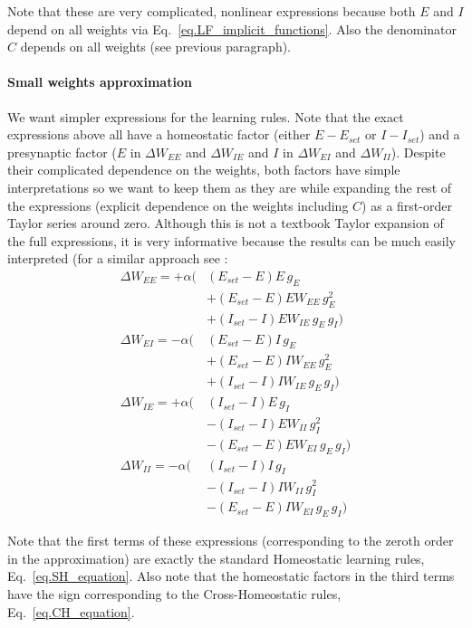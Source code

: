 \documentclass[
twocolumn,
]{article}
\newcommand{\EE}{\mathit{EE}}
\newcommand{\EI}{\mathit{EI}}
\newcommand{\IE}{\mathit{IE}}
\newcommand{\II}{\mathit{II}}
\newcommand{\set}{\mathit{set}}
\begin{document}
\noindent Note that these are very complicated, nonlinear expressions because both $E$ and $I$ depend on all weights via Eq.\ \ref{eq.LF_implicit_functions}. Also the denominator $C$ depends on all weights (see previous paragraph).


\paragraph{Small weights approximation}

We want simpler expressions for the learning rules. Note that the exact expressions above all have a homeostatic factor (either $E - E_{\set}$ or $I - I_{\set}$) and a presynaptic factor ($E$ in $\Delta W_{\EE}$ and $\Delta W_{\IE}$ and $I$ in $\Delta W_{\EI}$ and $\Delta W_{\II}$). Despite their complicated dependence on the weights, both factors have simple interpretations so we want to keep them as they are while expanding the rest of the expressions (explicit dependence on the weights including $C$) as a first-order Taylor series around zero. Although this is not a textbook Taylor expansion of the full expressions, it is very informative because the results can be much easily interpreted (for a similar approach see \cite{Mackwood2020}:
\begin{equation}
\begin{aligned}
\Delta W_{\EE} = + \alpha( & (E_{\set} - E)E \, g_E \\
& + (E_{\set} - E)E W_{\EE} \, g_E^2 \\
& + (I_{\set} - I)E W_{\IE} \, g_E \, g_I) \\
\Delta W_{\EI} = - \alpha( & (E_{\set} - E)I \, g_E \\
& + (E_{\set} - E)I W_{\EE} \, g_E^2 \\
& + (I_{\set} - I)I W_{\IE} \, g_E \, g_I) \\
\Delta W_{\IE} = + \alpha( & (I_{\set} - I)E \, g_I \\
& - (I_{\set} - I)E W_{\II} \, g_I^2 \\
& - (E_{\set} - E)E W_{\EI} \, g_E \, g_I) \\
\Delta W_{\II} = - \alpha( & (I_{\set} - I)I \, g_I \\
& - (I_{\set} - I)I W_{\II} \, g_I^2 \\
& - (E_{\set} - E)I W_{\EI} \, g_E \, g_I)
\end{aligned}
\label{eq.LF_smallweights}
\end{equation}

\noindent Note that the first terms of these expressions (corresponding to the zeroth order in the approximation) are exactly the standard Homeostatic learning rules, Eq.\ \ref{eq.SH_equation}. Also note that the homeostatic factors in the third terms have the sign corresponding to the Cross-Homeostatic rules, Eq.\ \ref{eq.CH_equation}.



%
\printbibliography
\end{document}
